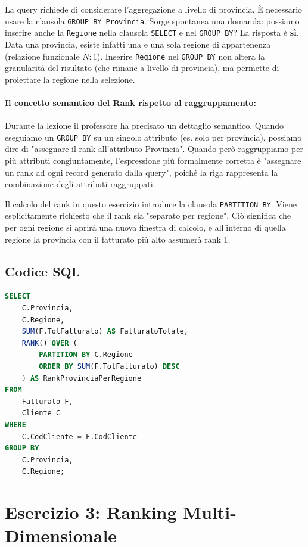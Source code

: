 La query richiede di considerare l'aggregazione a livello di provincia. È necessario usare la clausola \texttt{GROUP BY Provincia}. 
Sorge spontanea una domanda: possiamo inserire anche la \texttt{Regione} nella clausola \texttt{SELECT} e nel \texttt{GROUP BY}? La risposta è \textbf{sì}. Data una provincia, esiste infatti una e una sola regione di appartenenza (relazione funzionale $N:1$). Inserire \texttt{Regione} nel \texttt{GROUP BY} non altera la granularità del risultato (che rimane a livello di provincia), ma permette di proiettare la regione nella selezione.

\paragraph{Il concetto semantico del Rank rispetto al raggruppamento:}
Durante la lezione il professore ha precisato un dettaglio semantico. Quando eseguiamo un \texttt{GROUP BY} su un singolo attributo (es. solo per provincia), possiamo dire di "assegnare il rank all'attributo Provincia". Quando però raggruppiamo per più attributi congiuntamente, l'espressione più formalmente corretta è "assegnare un rank ad ogni record generato dalla query", poiché la riga rappresenta la combinazione degli attributi raggruppati.

Il calcolo del rank in questo esercizio introduce la clausola \texttt{PARTITION BY}. Viene esplicitamente richiesto che il rank sia "separato per regione". Ciò significa che per ogni regione si aprirà una nuova finestra di calcolo, e all'interno di quella regione la provincia con il fatturato più alto assumerà rank 1.

\subsection{Codice SQL}
\begin{lstlisting}[language=SQL, basicstyle=\ttfamily\small, keywordstyle=\color{blue}, stringstyle=\color{red}, commentstyle=\color{green!60!black}]
SELECT 
    C.Provincia,
    C.Regione,
    SUM(F.TotFatturato) AS FatturatoTotale,
    RANK() OVER (
        PARTITION BY C.Regione
        ORDER BY SUM(F.TotFatturato) DESC
    ) AS RankProvinciaPerRegione
FROM 
    Fatturato F, 
    Cliente C
WHERE 
    C.CodCliente = F.CodCliente
GROUP BY 
    C.Provincia, 
    C.Regione;
\end{lstlisting}

\section{Esercizio 3: Ranking Multi-Dimensionale}

